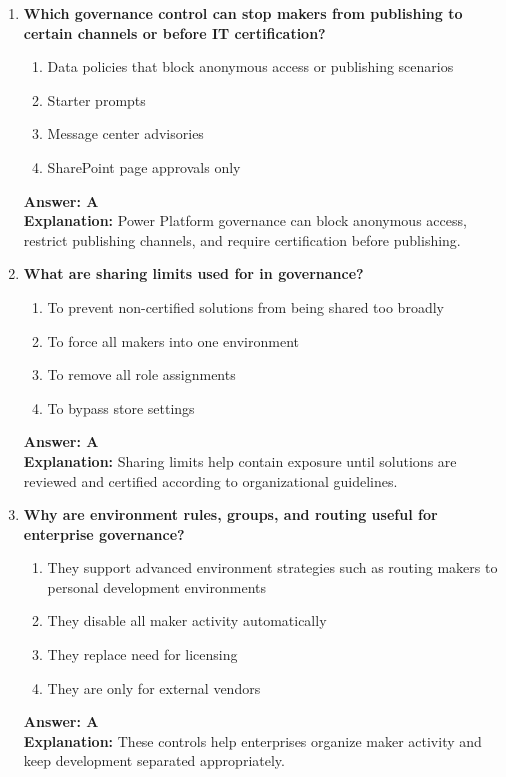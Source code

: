 \documentclass[10pt]{article}
\begin{document}
\begin{enumerate}[leftmargin=*]
\item \textbf{Which governance control can stop makers from publishing to certain channels or before IT certification?}
\begin{enumerate}[label=\Alph*.]
  \item Data policies that block anonymous access or publishing scenarios
  \item Starter prompts
  \item Message center advisories
  \item SharePoint page approvals only
\end{enumerate}
\textbf{Answer: A}\\
\textbf{Explanation:} Power Platform governance can block anonymous access, restrict publishing channels, and require certification before publishing.

\item \textbf{What are sharing limits used for in governance?}
\begin{enumerate}[label=\Alph*.]
  \item To prevent non-certified solutions from being shared too broadly
  \item To force all makers into one environment
  \item To remove all role assignments
  \item To bypass store settings
\end{enumerate}
\textbf{Answer: A}\\
\textbf{Explanation:} Sharing limits help contain exposure until solutions are reviewed and certified according to organizational guidelines.

\item \textbf{Why are environment rules, groups, and routing useful for enterprise governance?}
\begin{enumerate}[label=\Alph*.]
  \item They support advanced environment strategies such as routing makers to personal development environments
  \item They disable all maker activity automatically
  \item They replace need for licensing
  \item They are only for external vendors
\end{enumerate}
\textbf{Answer: A}\\
\textbf{Explanation:} These controls help enterprises organize maker activity and keep development separated appropriately.


\end{enumerate}
\end{document}
